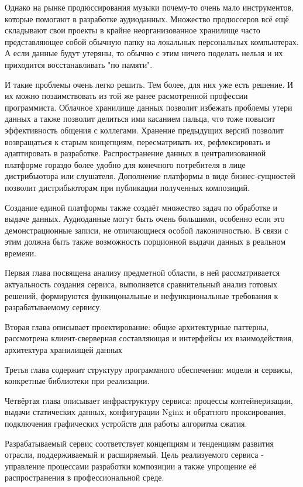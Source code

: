 \documentclass[a4paper, 12pt, oneside]{article}
\begin{document}
Однако на рынке продюссирования музыки почему-то очень мало инструментов, которые помогают 
в разработке аудиоданных. Множество продюссеров всё ещё складывают свои проекты в крайне неорганизованное
хранилище часто представляющее собой обычную папку на локальных персональных компьютерах. А 
если данные будут утеряны, то обычно с этим ничего поделать нельзя и их приходится восстанавливать
"по памяти".

И такие проблемы очень легко решить. Тем более, для них уже есть решение. И их можно 
позаимствовать из той же ранее расмотренной профессии программиста. Облачное хранилище данных
позволит избежать проблемы утери данных а также позволит делиться ими касанием пальца, что 
тоже повысит эффективность общения с коллегами. Хранение предыдущих версий позволит 
возвращаться к старым концепциям, пересматривать их, рефлексировать и адаптировать в разработке.
Распространение данных в централизованной платформе гораздо более удобно для конечного потребителя
в лице дистрибьютора или слушателя. Дополнение платформы в виде бизнес-сущностей позволит 
дистрибьюторам при публикации полученных композиций.

Создание единой платформы также создаёт множество задач по обработке и выдаче данных. 
Аудиоданные могут быть очень большими, особенно если это демонстрационные записи, не отличающиеся
особой лаконичностью. В связи с этим должна быть также возможность порционной выдачи данных в реальном 
времени.

Первая глава посвящена анализу предметной области, в ней рассматривается актуальность создания 
сервиса, выполняется сравнительный анализ готовых решений, формируются функицональные и нефункциональные
требования к разрабатываемому сервису.

Вторая глава описывает проектирование: общие архитектурные паттерны, рассмотрена клиент-сверверная
составляющая и интерфейсы их взаимодействия, архитектура хранилищей данных

Третья глава содержит структуру программного обеспечения: модели и сервисы, конкретные библиотеки при 
реализации.

Четвёртая глава описывает инфраструктуру сервиса: процессы контейнеризации, выдачи статических данных, 
конфигурации Nginx и обратного проксирования, подключения графических устройств для работы 
алгоритма сжатия.

Разрабатываемый сервис соответствует концепциям и тенденциям развития отрасли, поддерживаемый 
и расширяемый. Цель реализуемого сервиса - управление процессами разработки 
композиции а также упрощение её распространения в профессиональной среде.
\end{document}
